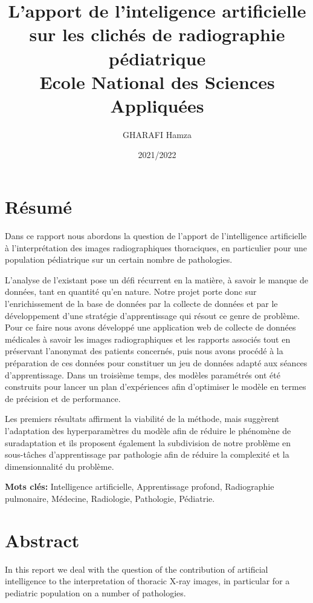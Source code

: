 \documentclass[12pt]{report}
\title{L'apport de l'inteligence artificielle sur les clichés de radiographie pédiatrique
\\ {\Large Ecole National des Sciences Appliquées}}
\author{GHARAFI Hamza}
\date{2021/2022}
\begin{document}
    \newcommand{\listequationsname}{Liste des Equations}
    \newlistof{myequations}{equ}{\listequationsname}
    \newcommand{\myequations}[1]{%
    \addcontentsline{equ}{myequations}{\protect\numberline{\theequation}#1}\par}

    \chapter*{\centering Résumé}
    Dans ce rapport nous abordons la question de l'apport de l'intelligence artificielle à l'interprétation des images radiographiques thoraciques, en particulier pour une population pédiatrique sur un certain nombre de pathologies.

    L'analyse de l'existant pose un défi récurrent en la matière, à savoir le manque de données, tant en quantité qu'en nature. Notre projet porte donc sur l'enrichissement de la base de données par la collecte de données et par le développement d'une stratégie d'apprentissage qui résout ce genre de problème. Pour ce faire nous avons développé une application web de collecte de données médicales à savoir les images radiographiques et les rapports associés tout en préservant l'anonymat des patients concernés, puis nous avons procédé à la préparation de ces données pour constituer un jeu de données adapté aux séances d'apprentissage.
    Dans un troisième temps, des modèles paramétrés ont été construits pour lancer un plan d'expériences afin d'optimiser le modèle en termes de précision et de performance. 
    
    Les premiers résultats affirment la viabilité de la méthode, mais suggèrent l'adaptation des hyperparamètres du modèle afin de réduire le phénomène de suradaptation et ils proposent également la subdivision de notre problème en sous-tâches d'apprentissage par pathologie afin de réduire la complexité et la dimensionnalité du problème.


    \vspace*{2cm}
    \textbf{Mots clés:} Intelligence artificielle, Apprentissage profond, Radiographie pulmonaire, Médecine, Radiologie, Pathologie, Pédiatrie.

    \chapter*{\centering Abstract}
    In this report we deal with the question of the contribution of artificial intelligence to the interpretation of thoracic X-ray images, in particular for a pediatric population on a number of pathologies.
    
\end{document}
